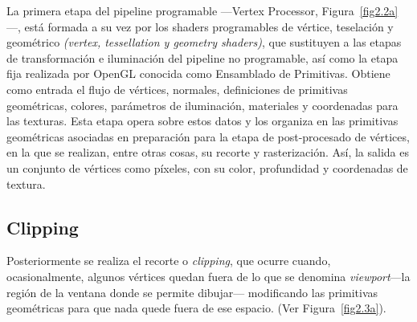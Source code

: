 La primera etapa del pipeline programable ---Vertex Processor,
Figura~\ref{fig2.2a}---, está formada a su vez por los shaders programables de
vértice, teselación y geométrico \textit{(vertex, tessellation y geometry
shaders)}, que sustituyen a las etapas de transformación e iluminación del
pipeline no programable, así como la etapa fija realizada por OpenGL conocida
como Ensamblado de Primitivas. Obtiene como entrada el flujo de vértices,
normales, definiciones de primitivas geométricas, colores, parámetros de
iluminación, materiales y coordenadas para las texturas. Esta etapa opera sobre
estos datos y los organiza en las primitivas geométricas asociadas en
preparación para la etapa de post-procesado de vértices, en la que se realizan,
entre otras cosas, su recorte y rasterización.  Así, la salida es un conjunto de
vértices como píxeles, con su color, profundidad y coordenadas de textura.

\subsection{Clipping}
\label{ref:clipping}

Posteriormente se realiza el recorte o \textit{clipping}, que ocurre cuando,
ocasionalmente, algunos vértices quedan fuera de lo que se denomina
\textit{viewport}---la región de la ventana donde se permite dibujar---
modificando las primitivas geométricas para que nada quede fuera de ese espacio.
(Ver Figura~\ref{fig2.3a}).

